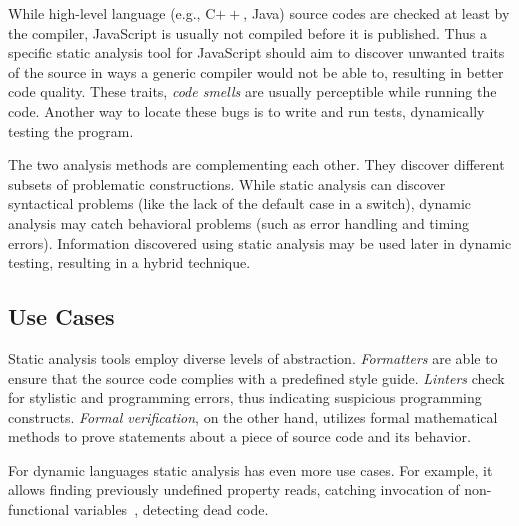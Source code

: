
While high-level language (e.g., C$++$, Java) source codes are checked at least by the compiler, JavaScript is usually not compiled before it is published. Thus a specific static analysis tool for JavaScript should aim to discover unwanted traits of the source in ways a generic compiler would not be able to, resulting in better code quality. These traits, \emph{code smells} are usually perceptible while running the code. Another way to locate these bugs is to write and run tests, dynamically testing the program.~\cite{wichmann_industrial_1995}

The two analysis methods are complementing each other. They discover different subsets of problematic constructions. While static analysis can discover syntactical problems (like the lack of the default case in a switch), dynamic analysis may catch behavioral problems (such as error handling and timing errors). Information discovered using static analysis may be used later in dynamic testing, resulting in a hybrid technique.



\subsection{Use Cases}
Static analysis tools employ diverse levels of abstraction. \emph{Formatters} are able to ensure that the source code complies with a predefined style guide. \emph{Linters} check for stylistic and programming errors, thus indicating suspicious programming constructs. \emph{Formal verification}, on the other hand, utilizes formal mathematical methods to prove statements about a piece of source code and its behavior.

For dynamic languages static analysis has even more use cases. For example, it allows finding previously undefined property reads, catching invocation of non-functional variables~\cite{jensen_type_2009}, detecting dead code.

